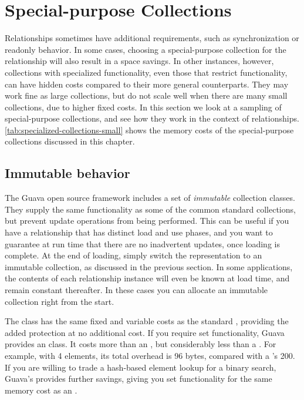 \section{Special-purpose Collections}
Relationships sometimes have additional requirements,
such as synchronization or readonly behavior. In some cases, choosing a
special-purpose collection for the relationship will also result in a space
savings.
In other instances,
however, collections with specialized functionality, even those that restrict functionality, 
can have hidden costs compared to their more
general counterparts. They may work fine as large
collections, but do not scale well when there are
many small collections, due to higher fixed costs.
In this section we look at a sampling of special-purpose
collections, and see how they work in the context of
relationships. \autoref{tab:specialized-collections-small} shows
the memory costs of the special-purpose collections discussed in this chapter.

\subsection{Immutable behavior}
\label{sec:immutable-collections}
The Guava open source framework includes a set of \emph{immutable} collection
classes.  They supply the same functionality as some of the 
common standard collections, but prevent update operations from being
performed. This can be useful if you have a relationship that
has distinct load and use phases, and you want to
guarantee at run time that there are no inadvertent
updates, once loading is complete. At the end of loading, simply switch the
representation to an immutable collection, as discussed in the previous
section. In some applications, the contents of each relationship instance will
even be known at load time, and remain constant thereafter. In
these cases you can allocate an immutable collection right from the start.

The class  has the same fixed
and variable costs as the standard , providing the
added protection at no additional cost.  If you require set functionality,
Guava provides an  class. It costs more than an
, but considerably less than a .
For example, with 4 elements, its total overhead is 96 bytes, compared with
a 's 200. If you are willing to trade a
hash-based element lookup for a binary search, Guava's  provides
further savings, giving you set functionality for the same memory cost as an
.

